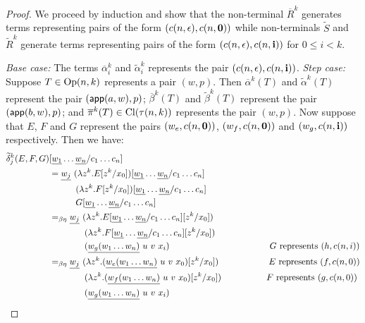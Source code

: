 \begin{proof}
We proceed by induction and show that the non-terminal $\overline R^k$ generates terms representing pairs of the form $(c(n,\epsilon),c(n,\mathbf{0}))$
while non-terminals $\widetilde S$ and $\widetilde R^k$ generate terms representing pairs of the form $(c(n,\epsilon),c(n,\mathbf{i}))$
for $0 \leq i<k$.

\emph{Base case:} The terms $\overline\alpha_i^k$ and $\widetilde\alpha_i^k$ represents the pair  $(c(n,\epsilon),c(n,\mathbf{i}))$.
\emph{Step case:} Suppose $T\in {\rm Op}(n,k)$ represents
 a pair $(w,p)$.  Then $\overline\alpha^k(T)$ and 
 $\widetilde\alpha^k(T)$ represent the pair
 $({\sf app}(a,w),p)$; $\overline\beta^k(T)$ and
 $\widetilde\beta^k(T)$ represent the pair
 $({\sf app}(b,w),p)$; and $\overline\pi^k(T) \in {\rm Cl}(\tau(n,k))$ represents the pair $(w,p)$. Now suppose that $E$, $F$ and $G$ represent the pairs
 $(w_e,c(n,\mathbf{0}))$, $(w_f,c(n,\mathbf{0}))$ and $(w_g,c(n,\mathbf{i}))$ respectively.
 Then we have:
 \begin{align*}
   \widetilde \delta^k_j (E,F,G) &[\zaioncencode{w_1}\ldots \zaioncencode{w_n}/c_1\ldots c_n] \\
   &= \zaioncencode{w_j}\  (\lambda z^k. E[z^k/x_0])[\zaioncencode{w_1}\ldots \zaioncencode{w_n}/c_1\ldots c_n] \\
       & \qquad\quad (\lambda z^k. F[z^k/x_0])[\zaioncencode{w_1}\ldots \zaioncencode{w_n}/c_1\ldots c_n] \\
       & \qquad\quad  G[\zaioncencode{w_1}\ldots \zaioncencode{w_n}/c_1\ldots c_n] \\
   &=_{\beta\eta} \zaioncencode{w_j}\  (\lambda z^k. E[\zaioncencode{w_1}\ldots \zaioncencode{w_n}/c_1\ldots c_n][z^k/x_0]) \\
       & \qquad\qquad (\lambda z^k. F[\zaioncencode{w_1}\ldots \zaioncencode{w_n}/c_1\ldots c_n][z^k/x_0]) \\
       & \qquad\qquad  (\zaioncencode{w_g(w_1\ldots w_n)}~u~v~x_i) \hspace{4cm}\mbox{$G$ represents $(h,c(n,i))$}\\
   &=_{\beta\eta} \zaioncencode{w_j}\  (\lambda z^k. (\zaioncencode{w_e(w_1\ldots w_n)}~u~v~x_0)[z^k/x_0]) \hspace{2cm}\mbox{$E$ represents $(f,c(n,0))$} \\
       & \qquad\qquad (\lambda z^k. (\zaioncencode{w_f(w_1\ldots w_n)}~u~v~x_0)[z^k/x_0]) \hspace{1.8cm}\mbox{$F$ represents $(g,c(n,0))$} \\
       & \qquad\qquad  (\zaioncencode{w_g(w_1\ldots w_n)}~u~v~x_i)\\

\end{align*}
\end{proof}
